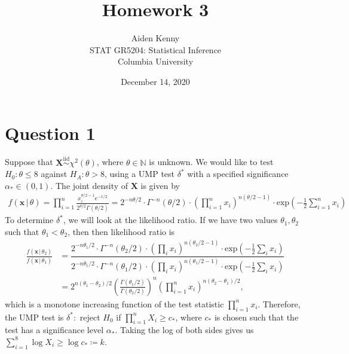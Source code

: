 \documentclass[10pt]{article}
\title{
    {\Large Homework 3}
}
\author{
    {\normalsize Aiden Kenny}\\
    {\normalsize STAT GR5204: Statistical Inference}\\
    {\normalsize Columbia University}
}
\date{\normalsize December 14, 2020}
\begin{document}
\maketitle

\section{Question 1} \noindent
Suppose that \(\bm{X} \overset{\mathrm{iid}}{\sim} \chi^2(\theta)\), where \(\theta \in \mathbb{N}\) is unknown. We would like to test 
\(H_0 : \theta \le 8\) against \(H_A : \theta > 8\), using a UMP test \(\delta^*\) with a specified significance \(\alpha_* \in (0,1)\). 
The joint density of \(\bm{X}\) is given by 
\begin{align*}
    f(\mathbf{x} \,|\, \theta)
    = \prod_{i=1}^n \frac{x_i^{\theta / 2 - 1} \mathrm{e}^{-x/2}}{2^{\theta/2} \Gamma(\theta/2)}
    = 2^{-n\theta/2} \cdot \Gamma^{-n}(\theta/2) \cdot \left( \prod_{i=1}^n x_i \right)^{n(\theta/2 - 1)} \cdot \mathrm{exp}\left( -\frac{1}{2} \sum_{i=1}^n x_i \right)
\end{align*}
To determine \(\delta^*\), we will look at the likelihood ratio. If we have two values \(\theta_1,\theta_2\) such that \(\theta_1 < \theta_2\), then then 
likelihood ratio is 
\begin{align*}
    \frac{f(\mathbf{x} \,|\, \theta_2)}{f(\mathbf{x} \,|\, \theta_1)}
    &= \dfrac{
        2^{-n\theta_1/2} \cdot \Gamma^{-n}(\theta_2/2) \cdot \left( \prod_i x_i \right)^{n(\theta_2/2 - 1)} \cdot \mathrm{exp}\left( -\frac{1}{2} \sum_i x_i \right)
    }{
        2^{-n\theta_1/2} \cdot \Gamma^{-n}(\theta_1/2) \cdot \left( \prod_i x_i \right)^{n(\theta_1/2 - 1)} \cdot \mathrm{exp}\left( -\frac{1}{2} \sum_i x_i \right)
    } \\
    &= 2^{n(\theta_1 - \theta_2)/2} \left( \frac{\Gamma(\theta_1/2)}{\Gamma(\theta_2/2)} \right)^n \left( \prod_{i=1}^n x_i \right)^{n(\theta_2 - \theta_1)/2},
\end{align*}
which is a monotone increasing function of the test statistic \(\prod_{i=1}^n x_i\). Therefore, the UMP test is \(\delta^* :\) reject \(H_0\) if 
\(\prod_{i=1}^n X_i \ge c_*\), where \(c_*\) is chosen such that the test has a significance level \(\alpha_*\). Taking the log of both sides gives us 
\(\sum_{i=1}^8 \log X_i \ge \log c_* \coloneqq k\). 
\end{document}
